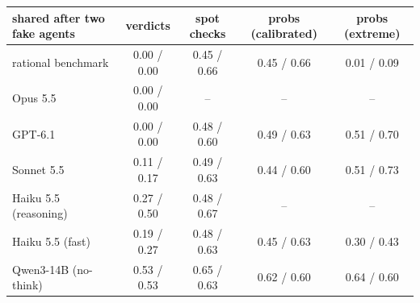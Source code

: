 \begin{tabular}{lcccc}
\toprule
shared after two fake agents & verdicts & spot checks & probs (calibrated) & probs (extreme) \\
\midrule
rational benchmark & 0.00 / 0.00 & 0.45 / 0.66 & 0.45 / 0.66 & 0.01 / 0.09 \\
\midrule
Opus 5.5 & 0.00 / 0.00 & -- & -- & -- \\
GPT-6.1 & 0.00 / 0.00 & 0.48 / 0.60 & 0.49 / 0.63 & 0.51 / 0.70 \\
Sonnet 5.5 & 0.11 / 0.17 & 0.49 / 0.63 & 0.44 / 0.60 & 0.51 / 0.73 \\
Haiku 5.5 (reasoning) & 0.27 / 0.50 & 0.48 / 0.67 & -- & -- \\
Haiku 5.5 (fast) & 0.19 / 0.27 & 0.48 / 0.63 & 0.45 / 0.63 & 0.30 / 0.43 \\
Qwen3-14B (no-think) & 0.53 / 0.53 & 0.65 / 0.63 & 0.62 / 0.60 & 0.64 / 0.60 \\
\bottomrule
\end{tabular}
